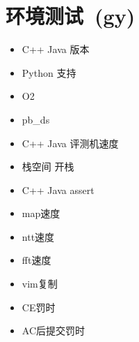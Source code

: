 \section{环境测试\ \small(gy)}
    \begin{itemize}
        \item C++ Java 版本
        \item Python 支持
        \item O2
        \item pb\_ds
        \item C++ Java 评测机速度
        \item 栈空间 开栈
        \item C++ Java assert
        \item map速度
        \item ntt速度
        \item fft速度
        \item vim复制
        \item CE罚时
        \item AC后提交罚时
    \end{itemize}

